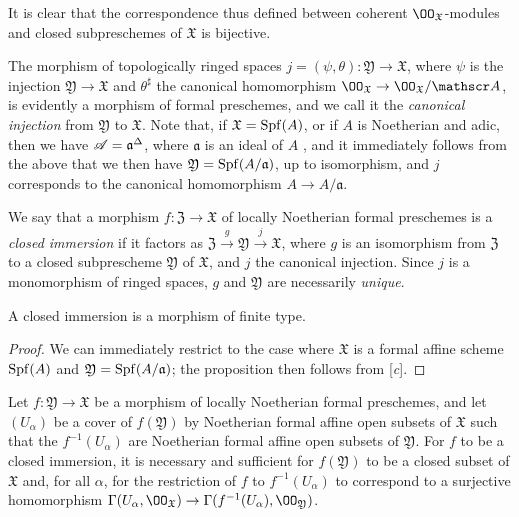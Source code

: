 It is clear that the correspondence thus defined between coherent $\OO_\mathfrak{X}$-modules and closed subpreschemes of $\mathfrak{X}$ is bijective.

The morphism of topologically ringed spaces $j=(\psi,\theta):\mathfrak{Y}\to\mathfrak{X}$, where $\psi$ is the injection $\mathfrak{Y}\to\mathfrak{X}$ and $\theta^\sharp$ the canonical homomorphism $\OO_\mathfrak{X}\to\OO_\mathfrak{X}/\sh{A}$, is evidently  a morphism of formal preschemes, and we call it the \emph{canonical injection} from $\mathfrak{Y}$ to $\mathfrak{X}$.
Note that, if $\mathfrak{X}=\operatorname{Spf}(A)$, or if $A$ is Noetherian and adic, then we have $\mathscr{A}=\mathfrak{a}^\Delta$, where $\mathfrak{a}$ is an ideal of $A$ , and it immediately follows from the above that we then have $\mathfrak{Y}=\operatorname{Spf}(A/\mathfrak{a})$, up to isomorphism, and $j$ corresponds  to the canonical homomorphism $A\to A/\mathfrak{a}$.

We say that a morphism $f:\mathfrak{Z}\to\mathfrak{X}$ of locally Noetherian formal preschemes is a \emph{closed immersion} if it factors as $\mathfrak{Z}\xrightarrow{g}\mathfrak{Y}\xrightarrow{j}\mathfrak{X}$, where $g$ is an isomorphism from $\mathfrak{Z}$ to a closed subprescheme $\mathfrak{Y}$ of $\mathfrak{X}$, and $j$ the canonical injection.
Since $j$ is a monomorphism of ringed spaces, $g$ and $\mathfrak{Y}$ are necessarily \emph{unique}.

\begin{prop}[10.14.3]
\label{1.10.14.3}
A closed immersion is a morphism of finite type.
\end{prop}

\begin{proof}
\label{proof-1.10.14.3}
We can immediately restrict to the case where $\mathfrak{X}$ is a formal affine scheme $\operatorname{Spf}(A)$ and $\mathfrak{Y}=\operatorname{Spf}(A/\mathfrak{a})$;
the proposition then follows from [\emph{c}].
\end{proof}

\begin{lem}[10.14.4]
\label{1.10.14.4}
Let $f:\mathfrak{Y}\to\mathfrak{X}$ be a morphism of locally Noetherian formal preschemes, and let $(U_\alpha)$ be a cover of $f(\mathfrak{Y})$ by Noetherian formal affine open subsets of $\mathfrak{X}$ such that the $f^{-1}(U_\alpha)$ are Noetherian formal affine open subsets of $\mathfrak{Y}$.
For $f$ to be a closed immersion, it is necessary and sufficient for $f(\mathfrak{Y})$ to be a closed subset of $\mathfrak{X}$ and, for all $\alpha$, for the restriction of $f$ to $f^{-1}(U_\alpha)$ to correspond  to a surjective homomorphism $\Gamma(U_\alpha,\OO_\mathfrak{X})\to\Gamma(f^{-1}(U_\alpha),\OO_\mathfrak{Y})$.
\end{lem}


